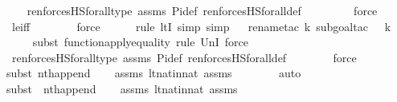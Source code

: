 \begin{isabellebody}
\ \ \isamarkupfalse%
\ ren{\isacharunderscore}{\kern0pt}forcesHS{\isacharunderscore}{\kern0pt}forall{\isacharunderscore}{\kern0pt}type\ assms\ Pi{\isacharunderscore}{\kern0pt}def\ ren{\isacharunderscore}{\kern0pt}forcesHS{\isacharunderscore}{\kern0pt}forall{\isacharunderscore}{\kern0pt}def\ \isanewline
\ \ \ \ \ \ \isamarkupfalse%
\ force\ \isanewline
\ \ \isamarkupfalse%
\ le{\isacharunderscore}{\kern0pt}iff\ \isanewline
\ \ \ \ \ \isamarkupfalse%
\ force\ \isanewline
\ \ \ \ \isamarkupfalse%
{\isacharparenleft}{\kern0pt}rule\ ltI{\isacharcomma}{\kern0pt}\ simp{\isacharcomma}{\kern0pt}\ simp{\isacharparenright}{\kern0pt}\isanewline
\ \ \isamarkupfalse%
{\isacharparenleft}{\kern0pt}rename{\isacharunderscore}{\kern0pt}tac\ k{\isacharcomma}{\kern0pt}\ subgoal{\isacharunderscore}{\kern0pt}tac\ {\isachardoublequoteopen}{}\ {\isacharless}{\kern0pt}\ k{\isachardoublequoteclose}{\isacharparenright}{\kern0pt}\isanewline
\ \ \ \ \isamarkupfalse%
{\isacharparenleft}{\kern0pt}subst\ function{\isacharunderscore}{\kern0pt}apply{\isacharunderscore}{\kern0pt}equality{\isacharcomma}{\kern0pt}\ rule\ UnI{}{\isacharcomma}{\kern0pt}\ force{\isacharparenright}{\kern0pt}\isanewline
\ \ \isamarkupfalse%
\ ren{\isacharunderscore}{\kern0pt}forcesHS{\isacharunderscore}{\kern0pt}forall{\isacharunderscore}{\kern0pt}type\ assms\ Pi{\isacharunderscore}{\kern0pt}def\ ren{\isacharunderscore}{\kern0pt}forcesHS{\isacharunderscore}{\kern0pt}forall{\isacharunderscore}{\kern0pt}def\ \isanewline
\ \ \ \ \ \isamarkupfalse%
\ force\ \isanewline
\ \ \ \ \isamarkupfalse%
{\isacharparenleft}{\kern0pt}subst\ nth{\isacharunderscore}{\kern0pt}append{\isacharparenright}{\kern0pt}\isanewline
\ \ \isamarkupfalse%
\ assms\ lt{\isacharunderscore}{\kern0pt}nat{\isacharunderscore}{\kern0pt}in{\isacharunderscore}{\kern0pt}nat\ assms\isanewline
\ \ \ \ \ \ \isamarkupfalse%
\ auto{\isacharbrackleft}{\kern0pt}{}{\isacharbrackright}{\kern0pt}\isanewline
\ \ \ \ \isamarkupfalse%
{\isacharparenleft}{\kern0pt}subst\ {\isacharparenleft}{\kern0pt}{}{\isacharparenright}{\kern0pt}\ nth{\isacharunderscore}{\kern0pt}append{\isacharparenright}{\kern0pt}\isanewline
\ \ \isamarkupfalse%
\ assms\ lt{\isacharunderscore}{\kern0pt}nat{\isacharunderscore}{\kern0pt}in{\isacharunderscore}{\kern0pt}nat\ assms\isanewline
\ \ \ \ \ \ \isamarkupfalse%

\end{isabellebody}
